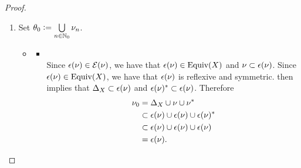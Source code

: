 \begin{proof}
\begin{enumerate}
\begin{enumerate}
\begin{itemize}
				\item {} \\
				Let $n \in \N_0$. Suppose that $\nu_n$ is symmetric. Then  implies that $\nu_n^* \subset \nu_n$. Therefore 
				\begin{align*}
					\nu_{n+1}^*
					& = (\nu_n \circ \nu_n)^* \\
					& = \nu_n^* \circ \nu_n^* \\
					& \subset \nu_n \circ \nu_n.
					& = \nu_{n+1}.
				\end{align*}
				Another application of  implies that $\nu_{n+1}$ is symmetric. 
			\end{itemize}
			By induction, for each $n \in \N_0$, $\nu_n$ is symmetric.
			\item Let $n \in \N_0$. Since $\nu_n$ is reflexive,  implies that $\Del_X \subset \nu_n$. Therefore  implies 
			\begin{align*}
				\nu_n
				& = \Del_X \circ \nu_n \\
				& \subset \nu_n \circ \nu_n \\
				& = \nu_{n+1}.
			\end{align*}
			Since $n \in \N_0$ is arbitrary, we have that for each $n \in \N_0$, $\nu_n \subset \nu_{n+1}$.
		\end{enumerate}
		\item Set $\theta_0 \vcentcolon= \bigcup\limits_{n \in \mathbb{N}_0} \nu_n$.
		\begin{itemize}
			\item 
			\begin{itemize}
				\item {} \\
				Since $\epsilon(\nu) \in \mathcal{E}(\nu)$, we have that $\epsilon(\nu) \in \operatorname*{\text{Equiv}}(X)$ and $\nu \subset \epsilon(\nu)$. Since $\epsilon(\nu) \in \operatorname*{\text{Equiv}}(X)$, we have that $\epsilon(\nu)$ is reflexive and symmetric.  then implies that  $\Delta_X \subset \epsilon(\nu)$ and $\epsilon(\nu)^* \subset \epsilon(\nu)$. Therefore  
				\begin{align*}
					\nu_0
					& = \Delta_X \cup \nu \cup \nu^* \\
					& \subset \epsilon(\nu) \cup \epsilon(\nu) \cup \epsilon(\nu)^* \\
					& \subset \epsilon(\nu) \cup \epsilon(\nu) \cup \epsilon(\nu) \\
					& = \epsilon(\nu). 
				\end{align*}

\end{itemize}
\end{itemize}
\end{enumerate}
\end{proof}
